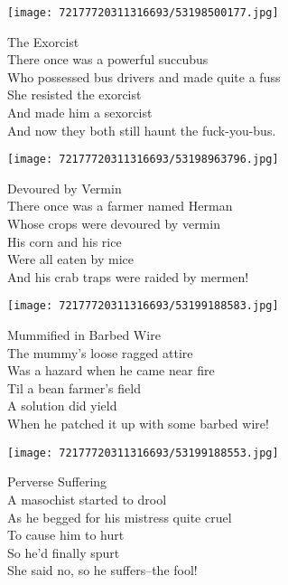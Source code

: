 \documentclass[10pt,letterpaper]{article}
\begin{document}
\begin{center}
\texttt{[image: 72177720311316693/53198500177.jpg]}
\end{center}

\begin{center}
The Exorcist\\
\vskip 0.2in
There once was a powerful succubus\\
Who possessed bus drivers and made quite a fuss\\
She resisted the exorcist\\
And made him a sexorcist\\
And now they both still haunt the fuck-you-bus.\\
\end{center}
\pagebreak

\begin{center}\texttt{[image: 72177720311316693/53198963796.jpg]}
\end{center}
\begin{center}
Devoured by Vermin\\
\vskip 0.2in
There once was a farmer named Herman\\
Whose crops were devoured by vermin\\
His corn and his rice\\
Were all eaten by mice\\
And his crab traps were raided by mermen!\\
\end{center}
\pagebreak

\begin{center}\texttt{[image: 72177720311316693/53199188583.jpg]}
\end{center}
\begin{center}
Mummified in Barbed Wire\\
\vskip 0.2in
The mummy's loose ragged attire\\
Was a hazard when he came near fire\\
Til a bean farmer's field\\
A solution did yield\\
When he patched it up with some barbed wire!\\
\end{center}
\pagebreak

\begin{center}\texttt{[image: 72177720311316693/53199188553.jpg]}
\end{center}
\begin{center}
Perverse Suffering\\
\vskip 0.2in
A masochist started to drool\\
As he begged for his mistress quite cruel\\
To cause him to hurt\\
So he'd finally spurt\\
She said no, so he suffers--the fool!\\
\end{center}
\pagebreak
\end{document}
